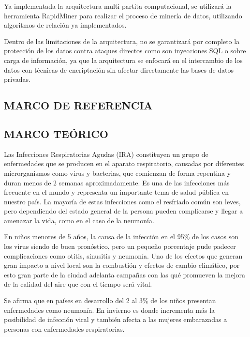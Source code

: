 \documentclass[a4paper, 11pt, oneside]{article}
\theoremstyle{definition}
\theoremstyle{remark}
\begin{document}
Ya implementada la arquitectura multi partita computacional, se utilizará la herramienta RapidMiner para realizar el proceso de minería de datos, utilizando algoritmos de relación ya implementados.

Dentro de las limitaciones de la arquitectura, no se garantizará por completo la protección de los datos contra ataques directos como son inyecciones SQL o sobre carga de información, ya que la arquitectura se enfocará en el intercambio de los datos con técnicas de encriptación sin afectar directamente las bases de datos privadas. 

\clearpage

\begin{center}
 \section{MARCO DE REFERENCIA}
\end{center}

\subsection{MARCO TEÓRICO}


Las Infecciones Respiratorias Agudas (IRA) constituyen un grupo de enfermedades que se producen en el aparato respiratorio, causadas por diferentes microrganismos como virus y bacterias, que comienzan de forma repentina y duran menos de 2 semanas aproximadamente. Es una de las infecciones más frecuente en el mundo y representa un importante tema de salud pública en nuestro país.  La mayoría de estas infecciones como el resfriado común son leves, pero dependiendo del estado general de la persona pueden complicarse y llegar a amenazar la vida, como en el caso de la neumonía.

En niños menores de 5 años, la causa de la infección en el  95\% de los casos son los virus siendo de buen pronóstico, pero un pequeño porcentaje pude padecer complicaciones como  otitis, sinusitis y neumonía. Uno de los efectos que generan gran impacto a nivel local son  la combustión y efectos de cambio climático, por esto  gran parte de la ciudad adelanta campañas con las qué promueven la mejora de la calidad del aire que con el tiempo será vital.

Se afirma que en países en desarrollo del 2 al 3\% de los niños presentan enfermedades como neumonía. En invierno es donde incrementa más la posibilidad de infección viral y  también afecta a las mujeres embarazadas a personas con enfermedades respiratorias.
\end{document}
